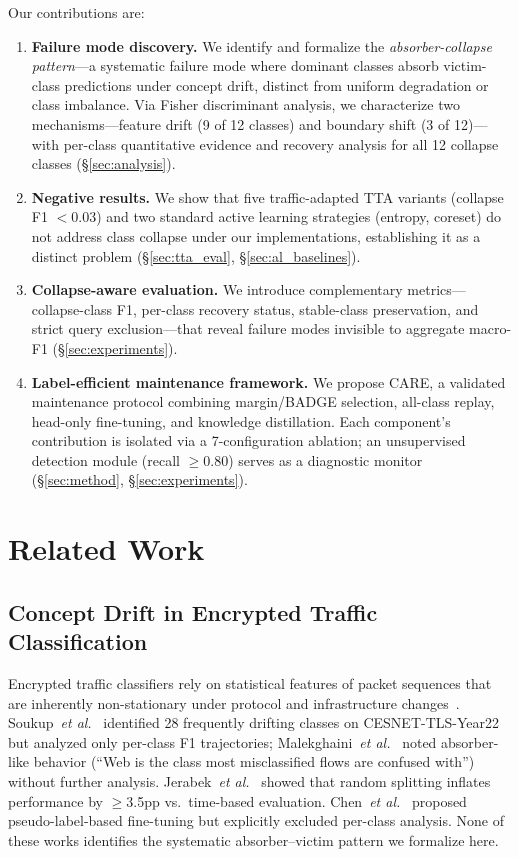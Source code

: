 \documentclass[journal]{IEEEtran}
\makeatletter
\newcommand{\ours}{CARE}  %
\newcommand{\etal}{\textit{et al.}\@}
\makeatother
\begin{document}
Our contributions are:
\begin{enumerate}
  \item \textbf{Failure mode discovery.} We identify and formalize the \textit{absorber-collapse pattern}---a systematic failure mode where dominant classes absorb victim-class predictions under concept drift, distinct from uniform degradation or class imbalance. Via Fisher discriminant analysis, we characterize two mechanisms---feature drift (9 of 12 classes) and boundary shift (3 of 12)---with per-class quantitative evidence and recovery analysis for all 12 collapse classes (\S\ref{sec:analysis}).
  \item \textbf{Negative results.} We show that five traffic-adapted TTA variants (collapse F1 ${<}0.03$) and two standard active learning strategies (entropy, coreset) do not address class collapse under our implementations, establishing it as a distinct problem (\S\ref{sec:tta_eval}, \S\ref{sec:al_baselines}).
  \item \textbf{Collapse-aware evaluation.} We introduce complementary metrics---collapse-class F1, per-class recovery status, stable-class preservation, and strict query exclusion---that reveal failure modes invisible to aggregate macro-F1 (\S\ref{sec:experiments}).
  \item \textbf{Label-efficient maintenance framework.} We propose \ours{}, a validated maintenance protocol combining margin/BADGE selection, all-class replay, head-only fine-tuning, and knowledge distillation. Each component's contribution is isolated via a 7-configuration ablation; an unsupervised detection module (recall $\geq$0.80) serves as a diagnostic monitor (\S\ref{sec:method}, \S\ref{sec:experiments}).
\end{enumerate}


\section{Related Work}
\label{sec:related}

\subsection{Concept Drift in Encrypted Traffic Classification}

Encrypted traffic classifiers rely on statistical features of packet sequences that are inherently non-stationary under protocol and infrastructure changes~\cite{rezaei2019deep, soukup2025drift, malekghaini2023drift}.
Soukup~\etal{}~\cite{soukup2025drift} identified 28 frequently drifting classes on CESNET-TLS-Year22 but analyzed only per-class F1 trajectories; Malekghaini~\etal{}~\cite{malekghaini2023drift} noted absorber-like behavior (``Web is the class most misclassified flows are confused with'') without further analysis.
Jerabek~\etal{}~\cite{jerabek2025eval} showed that random splitting inflates performance by $\geq$3.5pp vs.\ time-based evaluation.
Chen~\etal{}~\cite{chen2025selfevolving} proposed pseudo-label-based fine-tuning but explicitly excluded per-class analysis.
None of these works identifies the systematic absorber--victim pattern we formalize here.
\end{document}
